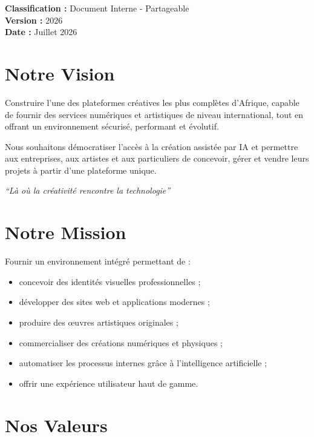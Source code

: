 \documentclass[12pt,a4paper,oneside]{book}
\begin{document}
\bigskip
\textbf{Classification :} Document Interne - Partageable\\
\textbf{Version :} 2026\\
\textbf{Date :} Juillet 2026

\tableofcontents

\mainmatter

\chapter{Notre Vision}

Construire l'une des plateformes créatives les plus complètes d'Afrique, capable de fournir des services numériques et artistiques de niveau international, tout en offrant un environnement sécurisé, performant et évolutif.

Nous souhaitons démocratiser l'accès à la création assistée par IA et permettre aux entreprises, aux artistes et aux particuliers de concevoir, gérer et vendre leurs projets à partir d'une plateforme unique.

\bigskip
\begin{center}
\begin{large}
\textit{``Là où la créativité rencontre la technologie''}
\end{large}
\end{center}

\chapter{Notre Mission}

Fournir un environnement intégré permettant de :

\begin{itemize}
\item concevoir des identités visuelles professionnelles ;
\item développer des sites web et applications modernes ;
\item produire des œuvres artistiques originales ;
\item commercialiser des créations numériques et physiques ;
\item automatiser les processus internes grâce à l'intelligence artificielle ;
\item offrir une expérience utilisateur haut de gamme.
\end{itemize}

\chapter{Nos Valeurs}
\end{document}
